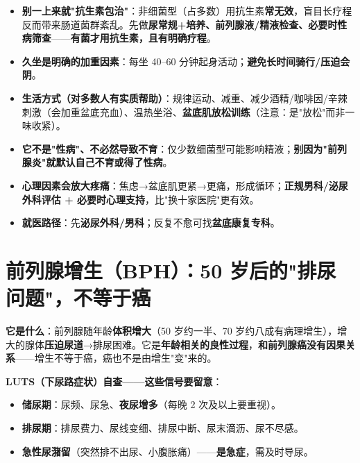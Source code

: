 \documentclass[12pt,UTF8,openany]{ctexbook}
\begin{document}
\begin{itemize}[leftmargin=2em,itemsep=0.3em]
  \item \textbf{别一上来就"抗生素包治"}：非细菌型（占多数）用抗生素\textbf{常无效}，盲目长疗程反而带来肠道菌群紊乱。先做\textbf{尿常规+培养、前列腺液/精液检查、必要时性病筛查}——\textbf{有菌才用抗生素，且有明确疗程}。
  \item \textbf{久坐是明确的加重因素}：每坐 40--60 分钟起身活动；\textbf{避免长时间骑行/压迫会阴}。
  \item \textbf{生活方式（对多数人有实质帮助）}：规律运动、减重、减少酒精/咖啡因/辛辣刺激（会加重盆底充血）、温热坐浴、\textbf{盆底肌放松训练}（注意：是"放松"而非一味收紧）。
  \item \textbf{它不是"性病"、不必然导致不育}：仅少数细菌型可能影响精液；\textbf{别因为"前列腺炎"就默认自己不育或得了性病}。
  \item \textbf{心理因素会放大疼痛}：焦虑→盆底肌更紧→更痛，形成循环；\textbf{正规男科/泌尿外科评估 + 必要时心理支持}，比"换十家医院"更有效。
  \item \textbf{就医路径}：先\textbf{泌尿外科/男科}；反复不愈可找\textbf{盆底康复专科}。
\end{itemize}

\section{前列腺增生（BPH）：50 岁后的"排尿问题"，不等于癌}

\textbf{它是什么}：前列腺随年龄\textbf{体积增大}（50 岁约一半、70 岁约八成有病理增生），增大的腺体\textbf{压迫尿道}→排尿困难。它是\textbf{年龄相关的良性过程}，\textbf{和前列腺癌没有因果关系}——增生不等于癌，癌也不是由增生"变"来的。

\textbf{LUTS（下尿路症状）自查——这些信号要留意}：
\begin{itemize}[leftmargin=2em,itemsep=0.3em]
  \item \textbf{储尿期}：尿频、尿急、\textbf{夜尿增多}（每晚 2 次及以上要重视）。
  \item \textbf{排尿期}：排尿费力、尿线变细、排尿中断、尿末滴沥、尿不尽感。
  \item \textbf{急性尿潴留}（突然排不出尿、小腹胀痛）——\textbf{是急症}，需及时导尿。
\end{itemize}
\end{document}

